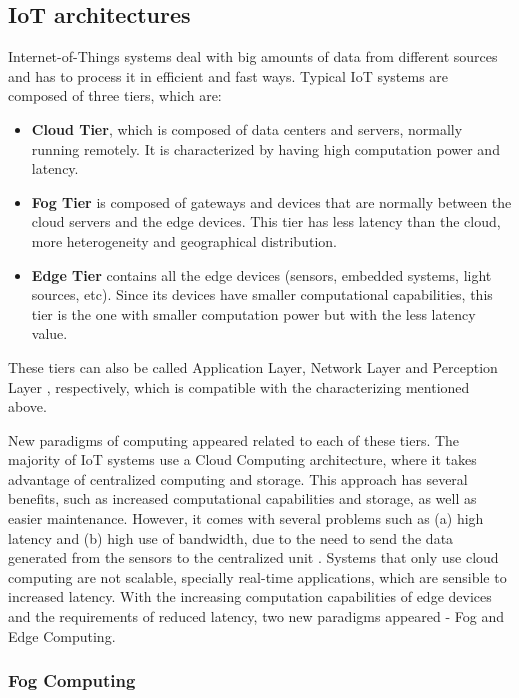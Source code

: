 \subsection{IoT architectures}\label{sec:architectures}

Internet-of-Things systems deal with big amounts of data from different sources and has to process it in efficient and fast ways. Typical IoT systems are composed of three tiers, which are:

\begin{itemize}
    \item \textbf{Cloud Tier}, which is composed of data centers and servers, normally running remotely. It is characterized by having high computation power and latency.
    \item \textbf{Fog Tier} is composed of gateways and devices that are normally between the cloud servers and the edge devices. This tier has less latency than the cloud, more heterogeneity and geographical distribution.
    \item \textbf{Edge Tier} contains all the edge devices (sensors, embedded systems, light sources, etc). Since its devices have smaller computational capabilities, this tier is the one with smaller computation power but with the less latency value.
\end{itemize}

\par These tiers can also be called Application Layer, Network Layer and Perception Layer \cite{iot_layers}, respectively, which is compatible with the characterizing mentioned above.

\par New paradigms of computing appeared related to each of these tiers. The majority of IoT systems use a Cloud Computing architecture, where it takes advantage of centralized computing and storage. This approach has several benefits, such as increased computational capabilities and storage, as well as easier maintenance. However, it comes with several problems such as (a) high latency and (b) high use of bandwidth, due to the need to send the data generated from the sensors to the centralized unit \cite{connecting_fog_and_cloud}. Systems that only use cloud computing are not scalable, specially real-time applications, which are sensible to increased latency. With the increasing computation capabilities of edge devices and the requirements of reduced latency, two new paradigms appeared - Fog and Edge Computing.

\subsubsection{Fog Computing}\label{sec:fog_computing}

